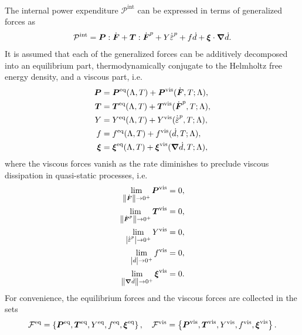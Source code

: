 The internal power expenditure $\mathcal{P}^\text{int}$ can be expressed in terms of generalized forces as
\begin{align}
  \mathcal{P}^\text{int} = \bfP:\dot{\bfF} + \bfT:\dot{\defgrad}^p + Y\epdot + f\dot{d} + \bs{\xi}\cdot\grad\dot{d}.
\end{align}
It is assumed that each of the generalized forces can be additively decomposed into an equilibrium part, thermodynamically conjugate to the Helmholtz free energy density, and a viscous part, i.e.
\begin{subequations}
  \begin{align}
    \bfP     & = \bfP^\text{eq}(\Lambda, T) + \bfP^\text{vis}(\dot{\defgrad}, T; \Lambda),       \\
    \bfT     & = \bfT^\text{eq}(\Lambda, T) + \bfT^\text{vis}(\dot{\defgrad}^p, T; \Lambda),     \\
    Y        & = Y^\text{eq}(\Lambda, T) + Y^\text{vis}(\epdot, T; \Lambda),                     \\
    f        & = f^\text{eq}(\Lambda, T) + f^\text{vis}(\dot{d}, T; \Lambda),                    \\
    \bs{\xi} & = \bs{\xi}^\text{eq}(\Lambda, T) + \bs{\xi}^\text{vis}(\grad\dot{d}, T; \Lambda),
  \end{align}
\end{subequations}
where the viscous forces vanish as the rate diminishes to preclude viscous dissipation in quasi-static processes, i.e.
\begin{subequations}
  \begin{align}
    \lim_{\norm{\dot{\defgrad}} \to 0^+}\bfP^\text{vis}   & = 0, \\
    \lim_{\norm{\dot{\defgrad}^p} \to 0^+}\bfT^\text{vis} & = 0, \\
    \lim_{\abs{\epdot} \to 0^+}Y^\text{vis}               & = 0, \\
    \lim_{\abs{\dot{d}} \to 0^+}f^\text{vis}              & = 0, \\
    \lim_{\norm{\grad\dot{d}} \to 0^+}\bs{\xi}^\text{vis} & = 0.
  \end{align}
\end{subequations}
For convenience, the equilibrium forces and the viscous forces are collected in the sets
\begin{align}
  \mathcal{F}^\text{eq} = \left\{ \boldsymbol{P}^\text{eq}, \boldsymbol{T}^\text{eq}, Y^\text{eq}, f^\text{eq}, \boldsymbol{\xi}^\text{eq} \right\}, \quad \mathcal{F}^\text{vis} = \left\{ \boldsymbol{P}^\text{vis}, \boldsymbol{T}^\text{vis}, Y^\text{vis}, f^\text{vis}, \boldsymbol{\xi}^\text{vis} \right\}.
\end{align}

